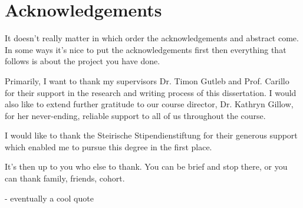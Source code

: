 \chapter*{Acknowledgements}
It doesn't really matter in which order the acknowledgements and abstract come.
In some ways it's nice to put the acknowledgements first then everything that follows is about the project you have done.

Primarily, I want to thank my supervisors Dr. Timon Gutleb and Prof. Carillo for their support in the research and writing process of this dissertation.
I would also like to extend further gratitude to our course director, Dr. Kathryn Gillow, for her never-ending, reliable support to all of us throughout the course.

I would like to thank the Steirische Stipendienstiftung for their generous support which enabled me to pursue this degree in the first place.

It's then up to you who else to thank. You can be brief and stop there, or you can thank family, friends, cohort.

- eventually a cool quote
